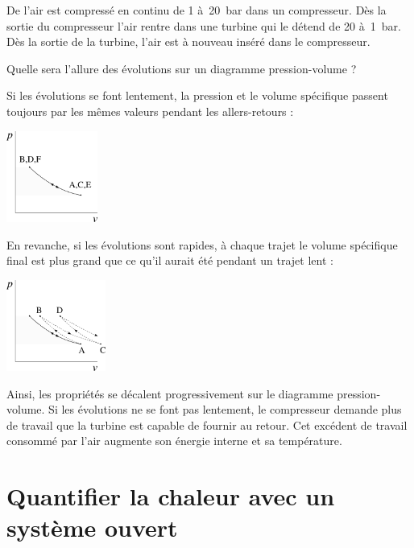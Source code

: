 		\clearfloats %
		\begin{anexample}
			De l’air est compressé en continu de 1 à~\SI{20}{\bar} dans un compresseur. Dès la sortie du compresseur l’air rentre dans une turbine qui le détend de 20 à~\SI{1}{\bar}. Dès la sortie de la turbine, l’air est à nouveau inséré dans le compresseur.
			
			Quelle sera l’allure des évolutions sur un diagramme pression-volume ?
					\begin{answer}
						Si les évolutions se font lentement, la pression et le volume spécifique passent toujours par les mêmes valeurs pendant les allers-retours :
							\begin{center}
								\includegraphics[height=3cm]{images/exe_pv_rev_so.png}
							\end{center}
						En revanche, si les évolutions sont rapides, à chaque trajet le volume spécifique final est plus grand que ce qu’il aurait été pendant un trajet lent :
							\begin{center}
								\includegraphics[height=3cm]{images/exe_pv_irr_so.png}
							\end{center}
						Ainsi, les propriétés se décalent progressivement sur le diagramme pression-volume. Si les évolutions ne se font pas lentement, le compresseur demande plus de travail que la turbine est capable de fournir au retour. Cet excédent de travail consommé par l’air augmente son énergie interne et sa température.
					\end{answer}

		\end{anexample}
	
\section{Quantifier la chaleur avec un système ouvert}


